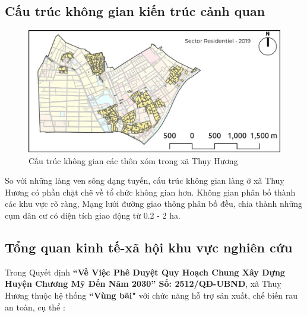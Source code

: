\documentclass[../thesis.tex]{subfiles}
\begin{document}
\subsection {Cấu trúc không gian kiến trúc cảnh quan}

\begin{figure}
\includegraphics[width=15cm]{Graphic/spatial-structure.jpg}
\caption{Cấu trúc không gian các thôn xóm trong xã Thụy Hương}
\end{figure}


So với những làng ven sông dạng tuyến, cấu trúc không gian làng ở xã Thuỵ Hương có phần chặt chẽ về tổ chức không gian hơn. Không gian phân bố thành các khu vực rõ ràng, 
Mạng lưới đường giao thông phân bố đều, chia thành những cụm dân cư có diện tích giao động từ 0.2 - 2 ha. 

\subsection {Tổng quan kinh tế-xã hội khu vực nghiên cứu}
Trong Quyết định \textbf{“Về Việc Phê Duyệt Quy Hoạch Chung Xây Dựng Huyện Chương Mỹ Đến Năm 2030” Số: 2512/QĐ-UBND}, xã Thuỵ Hương thuộc hệ thống \textbf{“Vùng bãi"} với chức năng hỗ trợ sản xuất, chế biến rau an toàn, cụ thể : 
\\
\end{document}
